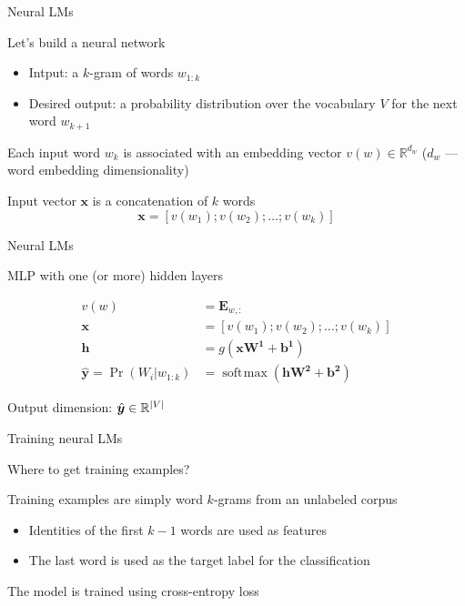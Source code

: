 \documentclass[12pt,aspectratio=169,handout]{beamer}
\DeclareMathOperator*{\softmax}{soft\!\max}
\begin{document}
\begin{frame}{Neural LMs}
	
Let's build a neural network
\begin{itemize}
	\item Intput: a $k$-gram of words $w_{1:k}$
	\item Desired output: a probability distribution over the vocabulary $V$ for the next word $w_{k+1}$
\end{itemize}

Each input word $w_k$ is associated with an embedding vector $v(w) \in \mathbb{R}^{d_w}$ ($d_w$ --- word embedding dimensionality)

Input vector $\bm{x}$ is a concatenation of $k$ words
$$
\bm{x} = \left[ v(w_1); v(w_2); \ldots; v(w_k) \right]
$$

\end{frame}

\begin{frame}{Neural LMs}

MLP with one (or more) hidden layers
	
$$
\begin{aligned}
v(w) &= \bm{E}_{w,:} \\
\bm{x} &= \left[ v(w_1); v(w_2); \ldots; v(w_k) \right] \\
\bm{h} &= g(\bm{x} \bm{W^1} + \bm{b^1}) \\
\hat{\bm{y}} = \Pr(W_i | w_{1:k}) &= \softmax (\bm{h} \bm{W^2} + \bm{b^2})
\end{aligned}
$$

Output dimension: $\hat{\bm{y}} \in \mathbb{R}^{\abs{V}}$
	
\end{frame}

\begin{frame}{Training neural LMs}

Where to get training examples?
	
Training examples are simply word $k$-grams from an unlabeled corpus
\begin{itemize}
	\item Identities of the first $k - 1$ words are used as features
	\item The last word is used as the target label for the classification
\end{itemize}

The model is trained using cross-entropy loss
\end{frame}
\end{document}
